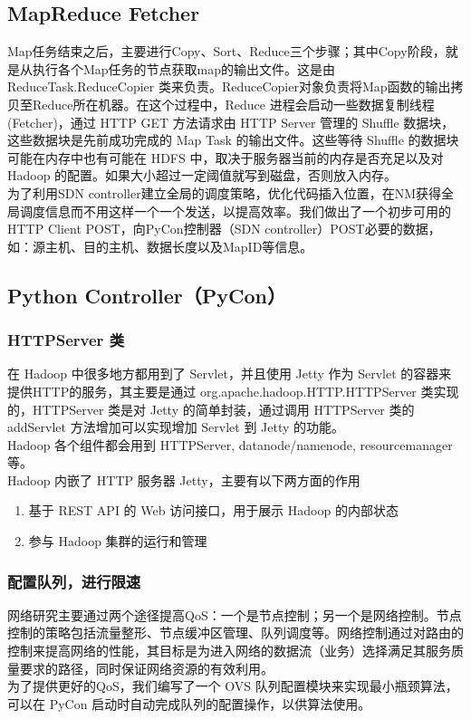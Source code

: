 \documentclass[a4paper, 11pt]{article}                                                   %
\begin{document}
\begin{CJK*}{UTF8}{song}
\subsection{MapReduce Fetcher}
Map任务结束之后，主要进行Copy、Sort、Reduce三个步骤；其中Copy阶段，就是从执行各个Map任务的节点获取map的输出文件。这是由ReduceTask.ReduceCopier 类来负责。ReduceCopier对象负责将Map函数的输出拷贝至Reduce所在机器。在这个过程中，Reduce 进程会启动一些数据复制线程 (Fetcher)，通过 HTTP GET 方法请求由 HTTP Server 管理的 Shuffle 数据块，这些数据块是先前成功完成的 Map Task 的输出文件。这些等待 Shuffle 的数据块可能在内存中也有可能在 HDFS 中，取决于服务器当前的内存是否充足以及对 Hadoop 的配置。如果大小超过一定阈值就写到磁盘，否则放入内存。\\
为了利用SDN controller建立全局的调度策略，优化代码插入位置，在NM获得全局调度信息而不用这样一个一个发送，以提高效率。我们做出了一个初步可用的 HTTP Client POST，向PyCon控制器（SDN controller）POST必要的数据，如：源主机、目的主机、数据长度以及MapID等信息。

\subsection{Python Controller（PyCon）}
\subsubsection{HTTPServer 类}

在 Hadoop 中很多地方都用到了 Servlet，并且使用 Jetty 作为 Servlet 的容器来提供HTTP的服务，其主要是通过 org.apache.hadoop.HTTP.HTTPServer 类实现的，HTTPServer 类是对 Jetty 的简单封装，通过调用 HTTPServer 类的 addServlet 方法增加可以实现增加 Servlet 到 Jetty 的功能。\\
 Hadoop 各个组件都会用到 HTTPServer, datanode/namenode, resourcemanager等。\\
Hadoop 内嵌了 HTTP 服务器 Jetty，主要有以下两方面的作用
\begin{enumerate}
  \item 基于 REST API 的 Web 访问接口，用于展示 Hadoop 的内部状态
  \item 参与 Hadoop 集群的运行和管理
\end{enumerate}

\subsubsection{配置队列，进行限速}
网络研究主要通过两个途径提高QoS：一个是节点控制；另一个是网络控制。节点控制的策略包括流量整形、节点缓冲区管理、队列调度等。网络控制通过对路由的控制来提高网络的性能，其目标是为进入网络的数据流（业务）选择满足其服务质量要求的路径，同时保证网络资源的有效利用。\\
为了提供更好的QoS，我们编写了一个 OVS 队列配置模块来实现最小瓶颈算法，可以在 PyCon 启动时自动完成队列的配置操作，以供算法使用。


\end{CJK*}
\end{document}

